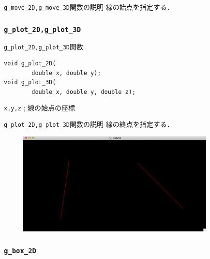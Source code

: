 \documentclass[platex,a4paper,12pt]{jsarticle}%
\begin{document}
\begin{itembox}[l]{\texttt{g\_move\_2D,g\_move\_3D}関数の説明}
線の始点を指定する．
\end{itembox}

\subsubsection{\texttt{g\_plot\_2D,g\_plot\_3D}}

\begin{itembox}[l]{\texttt{g\_plot\_2D,g\_plot\_3D}関数}
\begin{verbatim}
void g_plot_2D(
        double x, double y);
void g_plot_3D(
        double x, double y, double z);     
\end{verbatim}
\verb|x,y,z| ; 線の始点の座標\\
\end{itembox}

\begin{itembox}[l]{\texttt{g\_plot\_2D,g\_plot\_3D}関数の説明}
線の終点を指定する．
\end{itembox}

\begin{figure}[htb]
	\includegraphics[width=100mm]{./Figures/eps/Canvas_g_move_g_plot.eps}
\end{figure}




\clearpage
\subsubsection{\texttt{g\_box\_2D}}
\end{document}
